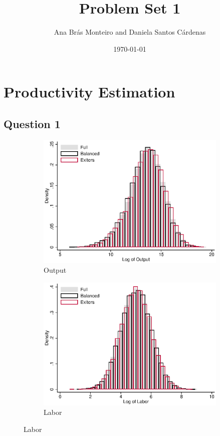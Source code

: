 \documentclass[11pt]{article}
\title{Problem Set 1}
\author{Ana Br\'{a}s Monteiro and Daniela Santos C\'{a}rdenas}
\date{\today}
\begin{document}
\maketitle

\section*{Productivity Estimation}

\subsection*{Question 1} \label{q1}






\begin{figure}[ht]
	\caption{Distribution by samples}\label{fig:sumstat}
	\centering	
	\begin{subfigure}[b]{.3\textwidth}
		\centering
		\caption{Output}
		\includegraphics[width=\textwidth]{histY.eps}
	\end{subfigure}
	\begin{subfigure}[b]{.3\textwidth}
		\centering
		\caption{Labor}
		\includegraphics[width=\textwidth]{histL.eps}

\end{subfigure}
\end{figure}
\end{document}

